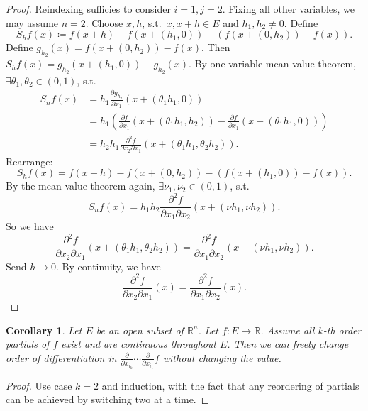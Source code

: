 \documentclass[12pt]{article}
\theoremstyle{plain}
\newtheorem*{corollary}{Corollary}
\theoremstyle{definition}
\begin{document}
\begin{proof}
    Reindexing sufficies to consider $i=1, j=2$.
    Fixing all other variables, we may assume $n=2$.
    Choose $x, h$, s.t.\ $x, x+h\in E$ and $h_1, h_2\neq0$.
    Define
    \[
        S_hf(x) \coloneqq f(x+h)-f(x+(h_1,0)) - (f(x+(0,h_2)) - f(x)).
    \]
    Define $g_{h_2}(x) = f(x+(0,h_2)) - f(x)$.
    Then $S_hf(x) = g_{h_2}(x+(h_1,0)) - g_{h_2}(x)$.
    By one variable mean value theorem, $\exists \theta_1,\theta_2\in (0,1)$, s.t.
    \[\begin{aligned}
            S_nf(x) &= h_1\frac{\partial g_{h_2}}{\partial x_1}(x+(\theta_1h_1, 0))\\
                    &=h_1\left(\frac{\partial f}{\partial x_1}(x+(\theta_1 h_1,h_2)) - \frac{\partial f}{\partial x_1}(x+(\theta_1h_1, 0))\right)\\
                    &=h_2h_1\frac{\partial^2 f}{\partial x_2 \partial x_1}(x+(\theta_1 h_1, \theta_2 h_2)).
    \end{aligned}\]
    Rearrange:
    \[
        S_hf(x)
        = f(x+h) - f(x+(0,h_2)) - (f(x+(h_1,0)) - f(x)).
    \]
    By the mean value theorem again, $\exists \nu_1, \nu_2\in(0,1)$, s.t.
    \[
        S_nf(x) = h_1h_2\frac{\partial^2 f}{\partial x_1 \partial x_2}(x+(\nu h_1, \nu h_2)).
    \]
    So we have
    \[
        \frac{\partial^2 f}{\partial x_2 \partial x_1}(x+(\theta_1 h_1, \theta_2 h_2)) = \frac{\partial^2 f}{\partial x_1 \partial x_2}(x+(\nu h_1, \nu h_2)).
    \]
    Send $h\rightarrow0$. By continuity, we have
    \[
        \frac{\partial^2 f}{\partial x_2 \partial x_1}(x) = \frac{\partial^2 f}{\partial x_1 \partial x_2}(x).
    \]
\end{proof}

\begin{corollary}
    Let $E$ be an open subset of $\mathbb{R}^n$.
    Let $f:E\rightarrow \mathbb{R}$.
    Assume all $k$-th order partials of $f$ exist and are continuous throughout $E$.
    Then we can freely change order of differentiation in $\frac{\partial}{\partial x_{i_k}}\cdots \frac{\partial}{\partial x_{i_1}}f$ without changing the value.
\end{corollary}
\begin{proof}
    Use case $k=2$ and induction, with the fact that any reordering of partials can be achieved by switching two at a time.
\end{proof}
\end{document}
